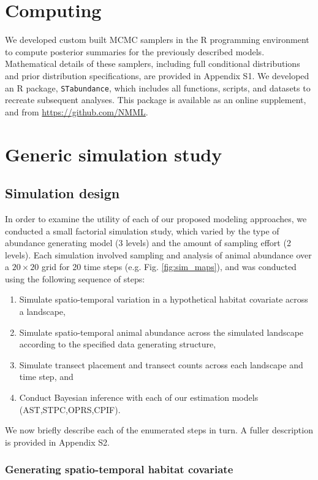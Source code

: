 \documentclass[times,mee,doublespace,]{besauth2}
\begin{document}
\section{Computing}

We developed custom built MCMC samplers in the R programming environment \citep{RTeam2013} to compute posterior summaries for the previously described models.  Mathematical details of these samplers, including full conditional distributions and prior distribution specifications, are provided in Appendix S1.  We developed an R package, \texttt{STabundance}, which includes all functions, scripts, and datasets to recreate subsequent analyses.  This package is available as an online supplement, and from \url{https://github.com/NMML}.

\section{Generic simulation study}

\subsection{Simulation design}

In order to examine the utility of each of our proposed modeling approaches, we conducted a small factorial simulation study, which varied by the type of abundance generating model (3 levels) and the amount of sampling effort (2 levels).  Each simulation involved sampling and analysis of animal abundance over a $20 \times 20$ grid for 20 time steps (e.g. Fig. \ref{fig:sim_maps}), and was conducted using the following sequence of steps:
\begin{enumerate}
 \item Simulate spatio-temporal variation in a hypothetical habitat covariate across a landscape,
 \item Simulate spatio-temporal animal abundance across the simulated landscape according to the specified data generating structure,
 \item Simulate transect placement and transect counts across each landscape and time step, and
 \item Conduct Bayesian inference with each of our estimation models (AST,STPC,OPRS,CPIF).
\end{enumerate}
We now briefly describe each of the enumerated steps in turn.  A fuller description is provided in Appendix S2.

\subsubsection{Generating spatio-temporal habitat covariate}
\end{document}
